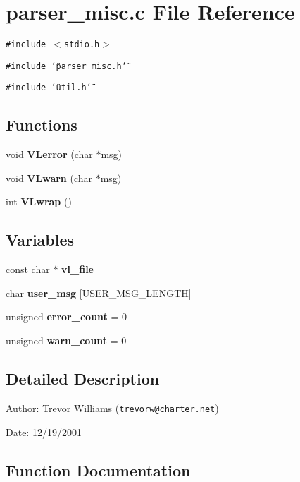 \section{parser\_\-misc.c File Reference}
\label{parser__misc_8c}
{\tt \#include $<$stdio.h$>$}\par
{\tt \#include \char`\"{}parser\_\-misc.h\char`\"{}}\par
{\tt \#include \char`\"{}util.h\char`\"{}}\par
\subsection*{Functions}
\begin{CompactItemize}
\item 
void {\bf VLerror} (char $\ast$msg)
\item 
void {\bf VLwarn} (char $\ast$msg)
\item 
int {\bf VLwrap} ()
\end{CompactItemize}
\subsection*{Variables}
\begin{CompactItemize}
\item 
const char $\ast$ {\bf vl\_\-file}
\item 
char {\bf user\_\-msg} [USER\_\-MSG\_\-LENGTH]
\item 
unsigned {\bf error\_\-count} = 0
\item 
unsigned {\bf warn\_\-count} = 0
\end{CompactItemize}


\subsection{Detailed Description}
\begin{Desc}
\item[Author:]Trevor Williams ({\tt trevorw@charter.net}) \end{Desc}
\begin{Desc}
\item[Date:]12/19/2001\end{Desc}


\subsection{Function Documentation}
